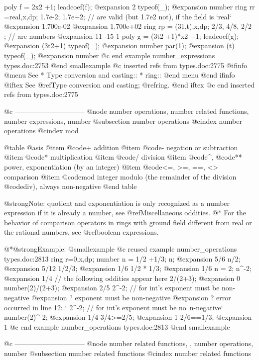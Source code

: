 {{{{{{  poly f = 2x2 +1;
  leadcoef(f);
@expansion{} 2
  typeof(_);
@expansion{} number
  ring rr =real,x,dp;
  1.7e-2; 1.7e+2; // are valid (but  1.7e2 not), if the field is `real`
@expansion{} 1.700e-02
@expansion{} 1.700e+02
  ring rp = (31,t),x,dp;
  2/3, 4/8, 2/2 ; // are numbers
@expansion{} 11 -15 1
  poly g = (3t2 +1)*x2 +1;
  leadcoef(g);
@expansion{} (3t2+1)
  typeof(_);
@expansion{} number
  par(1);
@expansion{} (t)
  typeof(_);
@expansion{} number
@c end example number_expressions types.doc:2753
@end smallexample
@c inserted refs from types.doc:2775
@ifinfo
@menu
See
* Type conversion and casting::
* ring::
@end menu
@end ifinfo
@iftex
See
@ref{Type conversion and casting};
@ref{ring}.
@end iftex
@c end inserted refs from types.doc:2775

@c ------------------------------
@node number operations, number related functions, number expressions, number
@subsection number operations
@cindex number operations
@cindex mod

@table @asis
@item @code{+}
addition
@item @code{-}
negation or subtraction
@item @code{*}
multiplication
@item @code{/}
division
@item @code{^}, @code{**}
power, exponentiation (by an integer)
@item @code{<=, >=, ==, <>}
comparison
@item @code{mod}
integer modulo (the remainder of the division @code{div}), always non-negative
@end table

@strong{Note:} quotient and exponentiation is only recognized as a
number expression if it is already a number, see @ref{Miscellaneous
oddities}.
@* For the behavior of comparison operators in rings with
ground field different from real or the rational numbers, see @ref{boolean
expressions}.

@*@strong{Example:}
@smallexample
@c reused example number_operations types.doc:2813 
  ring r=0,x,dp;
  number n = 1/2 +1/3;
  n;
@expansion{} 5/6
  n/2;
@expansion{} 5/12
  1/2/3;
@expansion{} 1/6
  1/2 * 1/3;
@expansion{} 1/6
  n = 2;
  n^-2;
@expansion{} 1/4
  // the following oddities appear here
  2/(2+3);
@expansion{} 0
  number(2)/(2+3);
@expansion{} 2/5
  2^-2; // for int's exponent must be non-negative
@expansion{}    ? exponent must be non-negative
@expansion{}    ? error occurred in line 12: `  2^-2; // for int's exponent must be no\
   n-negative`
  number(2)^-2;
@expansion{} 1/4
  3/4>=2/5;
@expansion{} 1
  2/6==1/3;
@expansion{} 1
@c end example number_operations types.doc:2813
@end smallexample

@c ------------------------------
@node number related functions,  , number operations, number
@subsection number related functions
@cindex number related functions

}}}}}}
